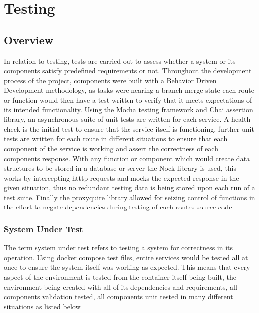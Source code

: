 \section{Testing}
	\subsection{Overview}
    In relation to testing, tests are carried out to assess whether a system or its components satisfy predefined requirements or not. Throughout the development process of the project, components were built with a Behavior Driven Development methodology, as tasks were nearing a branch merge state each route or function would then have a test written to verify that it meets expectations of its intended functionality. Using the Mocha testing framework and Chai assertion library, an asynchronous suite of unit tests are written for each service. A health check is the initial test to ensure that the service itself is functioning, further unit tests are written for each route in different situations to ensure that each component of the service is working and assert the correctness of each components response. With any function or component which would create data structures to be stored in a database or server the Nock library is used, this works by intercepting htttp requests and mocks the expected response in the given situation, thus no redundant testing data is being stored upon each run of a test suite. Finally the proxyquire library allowed for seizing control of functions in the effort to negate dependencies during testing of each routes source code.
    \subsubsection{System Under Test}
    The term system under test refers to testing a system for correctness in its operation. Using docker compose test files, entire services would be tested all at once to ensure the system itself was working as expected. This means that every aspect of the environment is tested from the container itself being built, the environment being created with all of its dependencies and requirements, all components validation tested, all components unit tested in many different situations as listed below
    
